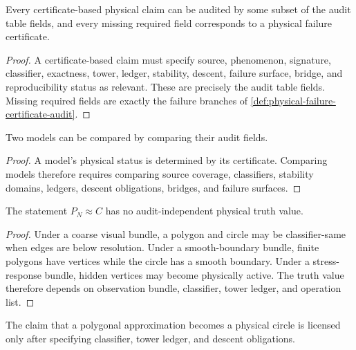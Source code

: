 \begin{theorem}
\label{thm:audit-table-covers-certificate-claims}
Every certificate-based physical claim can be audited by some subset of the audit table fields, and every missing required field corresponds to a physical failure certificate.
\end{theorem}

\begin{proof}
A certificate-based claim must specify source, phenomenon, signature, classifier, exactness, tower, ledger, stability, descent, failure surface, bridge, and reproducibility status as relevant. These are precisely the audit table fields. Missing required fields are exactly the failure branches of \autoref{def:physical-failure-certificate-audit}.
\end{proof}

\begin{corollary}
\label{cor:audit-tables-comparison-explicit}
Two models can be compared by comparing their audit fields.
\end{corollary}

\begin{proof}
A model's physical status is determined by its certificate. Comparing models therefore requires comparing source coverage, classifiers, stability domains, ledgers, descent obligations, bridges, and failure surfaces.
\end{proof}

\begin{theorem}
\label{thm:polygon-circle-audit-relative}
The statement $P_N\approx C$ has no audit-independent physical truth value.
\end{theorem}

\begin{proof}
Under a coarse visual bundle, a polygon and circle may be classifier-same when edges are below resolution. Under a smooth-boundary bundle, finite polygons have vertices while the circle has a smooth boundary. Under a stress-response bundle, hidden vertices may become physically active. The truth value therefore depends on observation bundle, classifier, tower ledger, and operation list.
\end{proof}

\begin{corollary}
\label{cor:polygon-becomes-circle-audit-collapse}
The claim that a polygonal approximation becomes a physical circle is licensed only after specifying classifier, tower ledger, and descent obligations.
\end{corollary}

